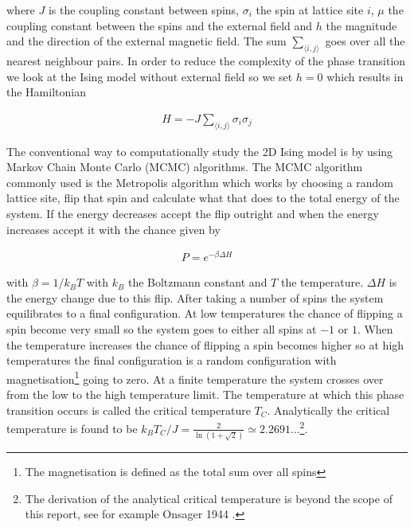 \documentclass[10 pt, a4paper]{article}
\begin{document}
where $J$ is the coupling constant between spins, $\sigma_i$ the spin at lattice site $i$, $\mu$ the coupling constant between the spins and the external field and $h$ the magnitude and the direction of the external magnetic field. The sum $\sum_{\langle i,j \rangle}$ goes over all the nearest neighbour pairs. In order to reduce the complexity of the phase transition we look at the Ising model without external field so we set $h = 0$ which results in the Hamiltonian

\begin{align}
H = -J  \sum_{\langle i,j \rangle} \sigma_i \sigma_j 
\end{align} 

The conventional way to computationally study the 2D Ising model is by using Markov Chain Monte Carlo (MCMC) algorithms. The MCMC algorithm commonly used is the Metropolis algorithm which works by choosing a random lattice site, flip that spin and calculate what that does to the total energy of the system. If the energy decreases accept the flip outright and when the energy increases accept it with the chance given by

\begin{align}
P = e^{- \beta \Delta H}
\end{align}

with $\beta = 1/k_B T$ with $k_B$ the Boltzmann constant and $T$ the temperature. $\Delta H$ is the energy change due to this flip. After taking a number of spins the system equilibrates to a final configuration. At low temperatures the chance of flipping a spin become very small so the system goes to either all spins at $-1$ or $1$. When the temperature increases the chance of flipping a spin becomes higher so at high temperatures the final configuration is a random configuration with magnetisation\footnote{The magnetisation is defined as the total sum over all spins} going to zero. At a finite temperature the system crosses over from the low to the high temperature limit. The temperature at which this phase transition occurs is called the critical temperature $T_C$. Analytically the critical temperature is found to be $k_B T_C / J = \frac{2}{\ln(1 + \sqrt{2})} \simeq 2.2691 \dots $\footnote{The derivation of the analytical critical temperature is beyond the scope of this report, see for example Onsager 1944 \cite{onsager}.}.
\end{document}
